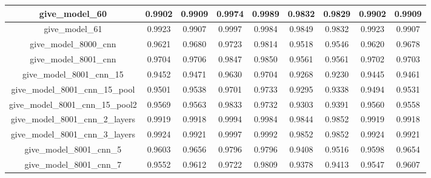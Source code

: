 \begin{table}[!h]
\begin{tabular} {|c|c|c|c|c|c|c|c|c| }
        give\_model\_60                   & 0.9902                        & 0.9909                         & 0.9974                      & 0.9989                  & 0.9832 & 0.9829 & 0.9902 & 0.9909 \\ \hline
        give\_model\_61                   & 0.9923                        & 0.9907                         & 0.9997                      & 0.9984                  & 0.9849 & 0.9832 & 0.9923 & 0.9907 \\ \hline
        give\_model\_8000\_cnn            & 0.9621                        & 0.9680                         & 0.9723                      & 0.9814                  & 0.9518 & 0.9546 & 0.9620 & 0.9678 \\ \hline
        give\_model\_8001\_cnn            & 0.9704                        & 0.9706                         & 0.9847                      & 0.9850                  & 0.9561 & 0.9561 & 0.9702 & 0.9703 \\ \hline
        give\_model\_8001\_cnn\_15        & 0.9452                        & 0.9471                         & 0.9630                      & 0.9704                  & 0.9268 & 0.9230 & 0.9445 & 0.9461 \\ \hline
        give\_model\_8001\_cnn\_15\_pool  & 0.9501                        & 0.9538                         & 0.9701                      & 0.9733                  & 0.9295 & 0.9338 & 0.9494 & 0.9531 \\ \hline
        give\_model\_8001\_cnn\_15\_pool2 & 0.9569                        & 0.9563                         & 0.9833                      & 0.9732                  & 0.9303 & 0.9391 & 0.9560 & 0.9558 \\ \hline
        give\_model\_8001\_cnn\_2\_layers & 0.9919                        & 0.9918                         & 0.9994                      & 0.9984                  & 0.9844 & 0.9852 & 0.9919 & 0.9918 \\ \hline
        give\_model\_8001\_cnn\_3\_layers & 0.9924                        & 0.9921                         & 0.9997                      & 0.9992                  & 0.9852 & 0.9852 & 0.9924 & 0.9921 \\ \hline
        give\_model\_8001\_cnn\_5         & 0.9603                        & 0.9656                         & 0.9796                      & 0.9796                  & 0.9408 & 0.9516 & 0.9598 & 0.9654 \\ \hline
        give\_model\_8001\_cnn\_7         & 0.9552                        & 0.9612                         & 0.9722                      & 0.9809                  & 0.9378 & 0.9413 & 0.9547 & 0.9607 \\ \hline

\end{tabular}
\end{table}
